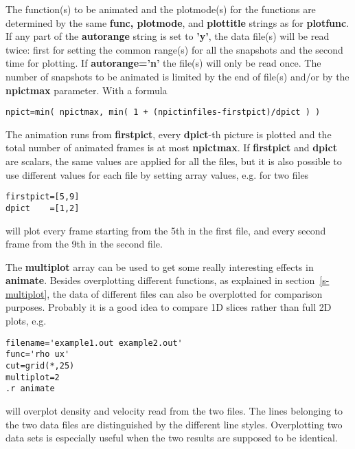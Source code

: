   The function(s) to be animated and the plotmode(s) for the functions 
   are determined by the same {\bf func, plotmode}, and {\bf plottitle} 
   strings as for {\bf plotfunc}. If any part of the 
   {\bf autorange} string is set to {\bf 'y'},
   the data file(s) will be read twice: first for setting the common range(s) 
   for all the snapshots and the second time for plotting.
   If {\bf autorange='n'} the file(s) will only be read once.
   The number of snapshots to be animated is limited by the end of 
   file(s) and/or by the {\bf npictmax} parameter. With a formula
\begin{verbatim}
npict=min( npictmax, min( 1 + (npictinfiles-firstpict)/dpict ) )
\end{verbatim}
   The animation runs from {\bf firstpict}, every {\bf dpict}-th picture is
   plotted and the total number of animated frames is at most {\bf npictmax}. 
   If {\bf firstpict} and {\bf dpict} are scalars, the same values are
   applied for all the files, but it is also possible to use different
   values for each file by setting array values, e.g. for two files
\begin{verbatim}
firstpict=[5,9]
dpict    =[1,2]
\end{verbatim}
   will plot every frame starting from the 5th in the first file,
   and every second frame from the 9th in the second file.

   The {\bf multiplot} array can be used to get some really interesting
   effects in {\bf animate}. Besides overplotting different functions,
   as explained in section~\ref{s-multiplot}, 
   the data of different files can also
   be overplotted for comparison purposes.
   Probably it is a good idea to compare 1D slices rather than full 2D plots,
   e.g. 
\begin{verbatim}
filename='example1.out example2.out'
func='rho ux'
cut=grid(*,25)
multiplot=2
.r animate
\end{verbatim}
   will overplot density and velocity read from the two files. 
   The lines belonging to the two data files are distinguished by
   the different line styles. Overplotting two data sets is
   especially useful when the two results are supposed to be identical.

